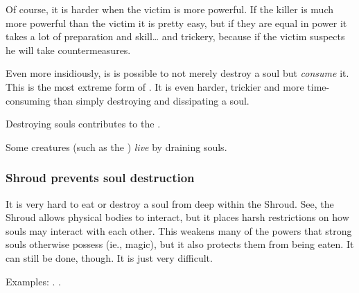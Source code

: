 Of course, it is harder when the victim is more powerful. 
If the killer is much more powerful than the victim it is pretty easy, but if they are equal in power it takes a lot of preparation and skill\ldots{} and trickery, because if the victim suspects he will take countermeasures. 

Even more insidiously, is is possible to not merely destroy a soul but \emph{consume} it. 
This is the most extreme form of . 
It is even harder, trickier and more time-consuming than simply destroying and dissipating a soul. 

Destroying souls contributes to the . 

Some creatures (such as the ) \emph{live} by draining souls. 






\subsubsection{Shroud prevents soul destruction}
It is very hard to eat or destroy a soul from deep within the Shroud. 
See, the Shroud allows physical bodies to interact, but it places harsh restrictions on how souls may interact with each other. 
This weakens many of the powers that strong souls otherwise possess (ie., magic), but it also protects them from being eaten. 
It can still be done, though. 
It is just very difficult. 

Examples: 
. 
. 















